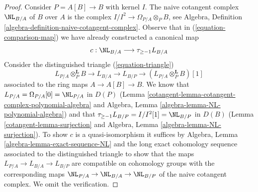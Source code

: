 \begin{proof}

Consider $P = A[B] \to B$ with kernel $I$. The naive cotangent
complex $\NL_{B/A}$ of $B$ over $A$ is the complex
$I/I^2 \to \Omega_{P/A} \otimes_P B$,
see Algebra, Definition \ref{algebra-definition-naive-cotangent-complex}.
Observe that in (\ref{equation-comparison-map}) we have already
constructed a canonical map
$$
c : \NL_{B/A} \longrightarrow \tau_{\geq -1}L_{B/A}
$$
Consider the distinguished triangle (\ref{equation-triangle})
$$
L_{P/A} \otimes_P^\mathbf{L} B \to L_{B/A} \to L_{B/P} \to
(L_{P/A} \otimes_P^\mathbf{L} B)[1]
$$
associated to the ring maps $A \to A[B] \to B$. We know that
$L_{P/A} = \Omega_{P/A}[0] = \NL_{P/A}$ in $D(P)$
(Lemma \ref{cotangent-lemma-cotangent-complex-polynomial-algebra}
and
Algebra, Lemma \ref{algebra-lemma-NL-polynomial-algebra})
and that
$\tau_{\geq -1}L_{B/P} = I/I^2[1] = \NL_{B/P}$ in $D(B)$
(Lemma \ref{cotangent-lemma-surjection} and
Algebra, Lemma \ref{algebra-lemma-NL-surjection}).
To show $c$ is a quasi-isomorphism it suffices by
Algebra, Lemma \ref{algebra-lemma-exact-sequence-NL}
and the long exact cohomology sequence associated to the
distinguished triangle
to show that the maps $L_{P/A} \to L_{B/A} \to L_{B/P}$ are compatible
on cohomology groups with the corresponding maps
$\NL_{P/A} \to \NL_{B/A} \to \NL_{B/P}$
of the naive cotangent complex. We omit the verification.
\end{proof}

